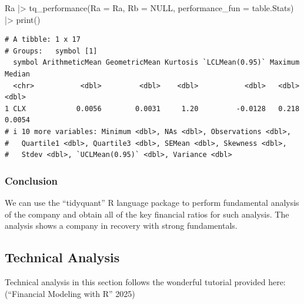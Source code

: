 \documentclass[
  letterpaper,
  DIV=11,
  numbers=noendperiod]{scrartcl}
\newenvironment{Shaded}{\begin{snugshade}}{\end{snugshade}}
\newcommand{\AttributeTok}[1]{\textcolor[rgb]{0.40,0.45,0.13}{#1}}
\newcommand{\ConstantTok}[1]{\textcolor[rgb]{0.56,0.35,0.01}{#1}}
\newcommand{\FunctionTok}[1]{\textcolor[rgb]{0.28,0.35,0.67}{#1}}
\newcommand{\NormalTok}[1]{\textcolor[rgb]{0.00,0.23,0.31}{#1}}
\newcommand{\SpecialCharTok}[1]{\textcolor[rgb]{0.37,0.37,0.37}{#1}}
\begin{document}
\begin{Shaded}
\begin{Highlighting}[]
\NormalTok{Ra }\SpecialCharTok{|\textgreater{}}
  \FunctionTok{tq\_performance}\NormalTok{(}\AttributeTok{Ra =}\NormalTok{ Ra, }\AttributeTok{Rb =} \ConstantTok{NULL}\NormalTok{, }\AttributeTok{performance\_fun =}\NormalTok{ table.Stats) }\SpecialCharTok{|\textgreater{}}
  \FunctionTok{print}\NormalTok{()}
\end{Highlighting}
\end{Shaded}

\begin{verbatim}
# A tibble: 1 x 17
# Groups:   symbol [1]
  symbol ArithmeticMean GeometricMean Kurtosis `LCLMean(0.95)` Maximum Median
  <chr>           <dbl>         <dbl>    <dbl>           <dbl>   <dbl>  <dbl>
1 CLX            0.0056        0.0031     1.20         -0.0128   0.218 0.0054
# i 10 more variables: Minimum <dbl>, NAs <dbl>, Observations <dbl>,
#   Quartile1 <dbl>, Quartile3 <dbl>, SEMean <dbl>, Skewness <dbl>,
#   Stdev <dbl>, `UCLMean(0.95)` <dbl>, Variance <dbl>
\end{verbatim}

\subsubsection{\texorpdfstring{\textbf{Conclusion}}{Conclusion}}\label{conclusion-2}

We can use the ``tidyquant'' R language package to perform fundamental
analysis of the company and obtain all of the key financial ratios for
such analysis. The analysis shows a company in recovery with strong
fundamentals.

\subsection{Technical Analysis}\label{technical-analysis}

\begin{tcolorbox}[enhanced jigsaw, left=2mm, colback=white, opacityback=0, coltitle=black, arc=.35mm, leftrule=.75mm, bottomrule=.15mm, colbacktitle=quarto-callout-note-color!10!white, toptitle=1mm, title=\textcolor{quarto-callout-note-color}{\faInfo}\hspace{0.5em}{Note}, opacitybacktitle=0.6, bottomtitle=1mm, titlerule=0mm, breakable, rightrule=.15mm, toprule=.15mm, colframe=quarto-callout-note-color-frame]

Technical analysis in this section follows the wonderful tutorial
provided here: ({``Financial Modeling with {R}''} 2025)

\end{tcolorbox}
\end{document}
